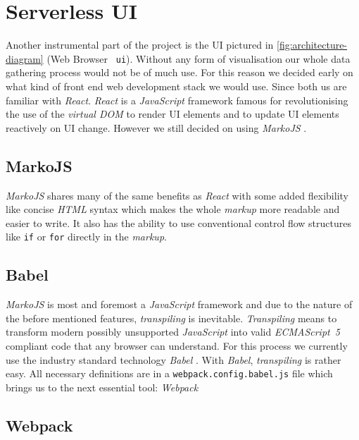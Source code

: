 \section{Serverless UI}

Another instrumental part of the project is the UI pictured in \autoref{fig:architecture-diagram}
(Web Browser \textrightarrow\ \texttt{ui}). Without any form of visualisation our whole data
gathering process would not be of much use. For this reason we decided early on what kind of front
end web development stack we would use. Since both us are familiar with \textit{React}.
\textit{React} is a \textit{JavaScript} framework famous for revolutionising the use of the
\textit{virtual DOM} to render UI elements and to update UI elements reactively on UI change.
However we still decided on using \textit{MarkoJS} \cite{marko}.

\subsection{MarkoJS}

\textit{MarkoJS} shares many of the same benefits as \textit{React} with some added flexibility like
concise \textit{HTML} syntax which makes the whole \textit{markup} more readable and easier to
write. It also has the ability to use conventional control flow structures like \texttt{if} or
\texttt{for} directly in the \textit{markup}.

\subsection{Babel}

\textit{MarkoJS} is most and foremost a \textit{JavaScript} framework and due to the nature of the
before mentioned features, \textit{transpiling} is inevitable. \textit{Transpiling} means to
transform modern possibly unsupported \textit{JavaScript} into valid \textit{ECMAScript~5} compliant
code that any browser can understand. For this process we currently use the industry standard
technology \textit{Babel} \cite{babel}. With \textit{Babel}, \textit{transpiling} is rather easy. All
necessary definitions are in a \texttt{webpack.config.babel.js} file which brings us to the next
essential tool: \textit{Webpack}

\subsection{Webpack}
\label{sec:webpack}

